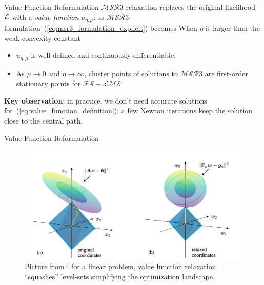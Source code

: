\documentclass[8pt]{beamer}
\newcommand{\ouralgo}{\ensuremath{\mathcal{MSR}3}}
\begin{document}
\begin{frame}{Value Function Reformulation}
$\ouralgo$-relaxation replaces the original likelihood $\operatorname{\mathcal{L}}$ with a \textit{value function} $u_{\eta,\mu}$:
so $\ouralgo$-formulation~(\ref{eq:msr3_formulation_explicit}) becomes
When $\eta$ is larger than the weak-convexity constant
\begin{itemize}
	\item $u_{\eta,\mu}$ is well-defined and continuously differentiable.
	\item As $\mu \rightarrow 0$ and $\eta \rightarrow \infty$, cluster points of solutions to $\ouralgo$ are first-order stationary points for $\mathcal{FS-LME}$ \\ 
\end{itemize}

\textbf{Key observation}: in practice, we don't need accurate solutions for~(\ref{eq:value_function_definition}): a few Newton iterations keep the solution close to the central path.
\end{frame}

\begin{frame}{Value Function Reformulation}
\begin{figure}
	\includegraphics[width=\textwidth]{Figures/intuition_prev_paper}
	\caption{\label{fig:intuition_prev} Picture from \cite{Zheng2018RelaxAndSplit}: for a linear problem, value function relaxation ``squashes'' level-sets simplifying the optimization landscape.}
\end{figure}
\end{frame}
\end{document}

